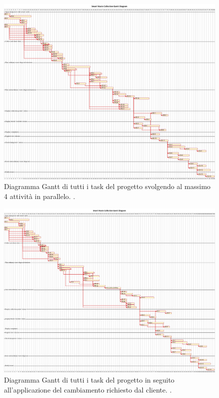 \begin{figure}[H]
    \centering
    \includegraphics[width=\textwidth]{../img/gantt.pm}
    \caption{Diagramma Gantt di tutti i task del progetto svolgendo al massimo 4 attività in parallelo. .}
    \label{fig:gantt}
\end{figure}

\begin{figure}[H]
    \centering
    \includegraphics[width=\textwidth]{../img/gantt-redefinition.pm}
    \caption{Diagramma Gantt di tutti i task del progetto in seguito all'applicazione del cambiamento richiesto dal cliente. .}
    \label{fig:gantt-redefinition}
\end{figure}
